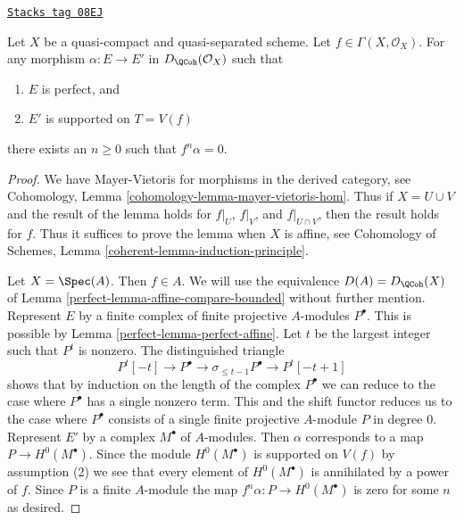 \begin{lemma}
\label{perfect-lemma-perfect-into-support-on-T}
\href{https://stacks.math.columbia.edu/tag/08EJ}{\texttt{Stacks tag 08EJ}}

Let $X$ be a quasi-compact and quasi-separated scheme.
Let $f \in \Gamma(X, \mathcal{O}_X)$.
For any morphism $\alpha : E \to E'$ in
$D_\QCoh(\mathcal{O}_X)$ such that
\begin{enumerate}
\item $E$ is perfect, and
\item $E'$ is supported on $T = V(f)$
\end{enumerate}
there exists an $n \geq 0$ such that $f^n \alpha  = 0$.
\end{lemma}

\begin{proof}

We have Mayer-Vietoris for morphisms in the derived category, see
Cohomology, Lemma \ref{cohomology-lemma-mayer-vietoris-hom}.
Thus if $X = U \cup V$ and the result of the lemma holds
for $f|_U$, $f|_V$, and $f|_{U \cap V}$, then the result holds for $f$.
Thus it suffices to prove the lemma when $X$ is affine, see
Cohomology of Schemes, Lemma \ref{coherent-lemma-induction-principle}.

\medskip\noindent
Let $X = \Spec(A)$. Then $f \in A$. We will
use the equivalence $D(A) = D_\QCoh(X)$ of
Lemma \ref{perfect-lemma-affine-compare-bounded}
without further mention.
Represent $E$ by a finite complex of finite projective $A$-modules
$P^\bullet$. This is possible by Lemma \ref{perfect-lemma-perfect-affine}.
Let $t$ be the largest integer such that $P^t$ is nonzero.
The distinguished triangle
$$
P^t[-t] \to P^\bullet \to \sigma_{\leq t - 1}P^\bullet \to P^t[-t + 1]
$$
shows that by induction on the length of the complex $P^\bullet$
we can reduce to the case where $P^\bullet$ has a single nonzero term.
This and the shift functor reduces us to the case where $P^\bullet$
consists of a single finite projective $A$-module $P$ in degree $0$.
Represent $E'$ by a complex $M^\bullet$ of $A$-modules.
Then $\alpha$ corresponds to a map $P \to H^0(M^\bullet)$.
Since the module $H^0(M^\bullet)$ is supported on $V(f)$ by assumption (2)
we see that every element of $H^0(M^\bullet)$ is annihilated by a power
of $f$. Since $P$ is a finite $A$-module the map
$f^n\alpha : P \to H^0(M^\bullet)$ is zero for some $n$ as desired.
\end{proof}

